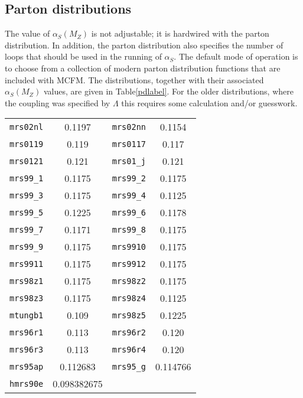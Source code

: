 \documentclass[12pt]{article}
\begin{document}
\subsection{Parton distributions}
The value of $\alpha_S(M_Z)$ is not adjustable; it is hardwired with the
parton distribution. In addition, the parton distribution also specifies
the number of loops that should be used in the running of $\alpha_S$.
The default mode of operation is to choose from a
collection of modern parton distribution functions that are included with
MCFM.  The distributions, together with their associated $\alpha_S(M_Z)$
values, are given in Table\ref{pdlabel}. 
For the older distributions, where the
coupling was specified by $\Lambda$ this requires 
some calculation and/or guesswork.
\begin{table}[h]
\begin{center}
\begin{tabular}{|c|c||c|c|}
\hline
{\tt mrs02nl}  & 0.1197       &
{\tt mrs02nn}  & 0.1154       \\
{\tt mrs0119}  & 0.119        &
{\tt mrs0117}  & 0.117        \\
{\tt mrs0121}  & 0.121        &
{\tt mrs01\_j} & 0.121        \\
{\tt mrs99\_1} & 0.1175       &
{\tt mrs99\_2} & 0.1175       \\
{\tt mrs99\_3} & 0.1175       &
{\tt mrs99\_4} & 0.1125       \\    
{\tt mrs99\_5} & 0.1225       &
{\tt mrs99\_6} & 0.1178       \\    
{\tt mrs99\_7} & 0.1171       &
{\tt mrs99\_8} & 0.1175       \\    
{\tt mrs99\_9} & 0.1175       &
{\tt mrs9910}  & 0.1175       \\    
{\tt mrs9911}  & 0.1175       &
{\tt mrs9912}  & 0.1175       \\    
{\tt mrs98z1}  &  0.1175      &   
{\tt mrs98z2}  &  0.1175      \\ 
{\tt mrs98z3}  &  0.1175      &  
{\tt mrs98z4}  &  0.1125      \\  
{\tt mtungb1}  &  0.109       &
{\tt mrs98z5}  &  0.1225      \\   
{\tt mrs96r1}  &  0.113       &    
{\tt mrs96r2}  &  0.120       \\  
{\tt mrs96r3}  &  0.113       &   
{\tt mrs96r4}  &  0.120       \\   
{\tt mrs95ap}  &  0.112683    & 
{\tt mrs95\_g} &  0.114766    \\
{\tt hmrs90e}  &  0.098382675 & 

\end{tabular}
\end{center}
\end{table}
\end{document}
